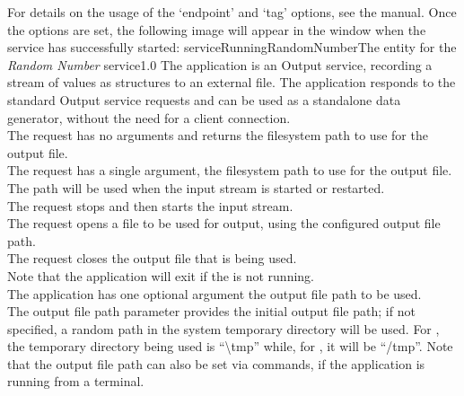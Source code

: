 For details on the usage of the `endpoint' and `tag' options, see the \emph{\MMMU} manual.
Once the options are set, the following image will appear in the \emph{\MMMU} window when
the service has successfully started:
%
{serviceRunningRandomNumber}{The \emph{\MMMU} entity for the \emph{Random Number}
service}{1.0}
\condPage
{}
The  application is an Output
service, recording a stream of \yarp{} values as \json{} structures to an external file.
The application responds to the standard Output service requests and can be used as a
standalone data generator, without the need for a client connection.\\

The  request has no arguments and
returns the file\longDash{}system path to use for the output file.\\

The  request has a single argument,
the file\longDash{}system path to use for the output file.
The path will be used when the input stream is started or restarted.\\

The  request stops and then
starts the input stream.\\

The  request opens a file to be
used for output, using the configured output file path.\\

The  request closes the output
file that is being used.\\

Note that the application will exit if the  is not
running.\\

The application has one optional argument \longDash{} the output file path to be used.
\insertAppParameters
{}
\insertOutputServiceComment\\

The output file path parameter provides the initial output file path; if not specified, a
random path in the system temporary directory will be used.
For \win, the temporary directory being used is ``\textbackslash{}tmp'' while, for \osx{},
it will be ``/tmp''.
Note that the output file path can also be set via commands, if the application is
running from a terminal.\\

